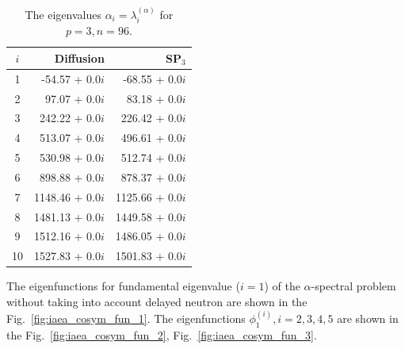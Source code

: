 \documentclass[authoryear]{elsarticle}
\begin{document}
\begin{table}[h]
\caption{The eigenvalues $\alpha_i=\lambda_i^{(\alpha)}$ for $p=3, n=96$.}
\label{tab:iaea_cosym_alpha_10}
\begin{center}
\begin{tabular}{crr}
\hline
$i$ & Diffusion & SP$_3$ \\
\hline
1 &-54.57 + 0.0$i$&-68.55 + 0.0$i$ \\
2 &  97.07 + 0.0$i$&83.18 + 0.0$i$ \\
3 &242.22 + 0.0$i$&226.42 + 0.0$i$ \\
4 &513.07 + 0.0$i$&496.61 + 0.0$i$ \\
5 &530.98 + 0.0$i$&512.74 + 0.0$i$ \\
6 &898.88 + 0.0$i$&878.37 + 0.0$i$ \\
7 &1148.46 + 0.0$i$&1125.66 + 0.0$i$ \\
8 &1481.13 + 0.0$i$&1449.58 + 0.0$i$ \\
9 &1512.16 + 0.0$i$&1486.05 + 0.0$i$ \\
10&1527.83 + 0.0$i$&1501.83 + 0.0$i$ \\
\hline
\end{tabular}
\end{center}
\end{table}

The eigenfunctions for fundamental eigenvalue ($i=1$) of the $\alpha$-spectral problem without taking into account delayed neutron are shown in the Fig.~\ref{fig:iaea_cosym_fun_1}. 
The eigenfunctions $\phi_1^{(i)}, i=2,3,4,5$ are shown in the Fig.~\ref{fig:iaea_cosym_fun_2}, Fig.~\ref{fig:iaea_cosym_fun_3}.
\end{document}
